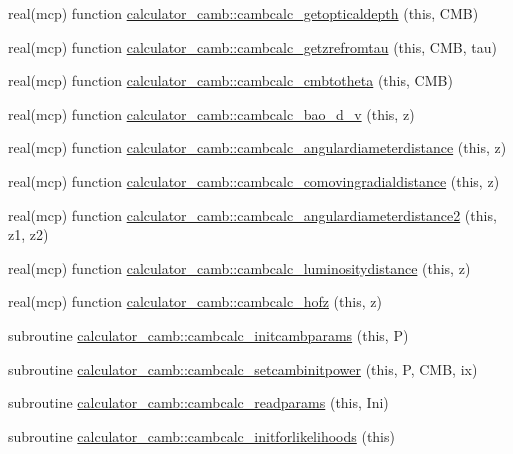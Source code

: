 \begin{DoxyCompactItemize}
\item 
real(mcp) function \mbox{\hyperlink{namespacecalculator__camb_ac09824dcbd350dcc819683a630b6e646}{calculator\+\_\+camb\+::cambcalc\+\_\+getopticaldepth}} (this, C\+MB)
\item 
real(mcp) function \mbox{\hyperlink{namespacecalculator__camb_a36d033f09a4d35c8b9a37d518fcebda0}{calculator\+\_\+camb\+::cambcalc\+\_\+getzrefromtau}} (this, C\+MB, tau)
\item 
real(mcp) function \mbox{\hyperlink{namespacecalculator__camb_a88bb5f71c4e4784315929d98702a1214}{calculator\+\_\+camb\+::cambcalc\+\_\+cmbtotheta}} (this, C\+MB)
\item 
real(mcp) function \mbox{\hyperlink{namespacecalculator__camb_a18709a68a49a6989073dae760f643430}{calculator\+\_\+camb\+::cambcalc\+\_\+bao\+\_\+d\+\_\+v}} (this, z)
\item 
real(mcp) function \mbox{\hyperlink{namespacecalculator__camb_a40bf5a8b3435b93efcaa688ecb4867f4}{calculator\+\_\+camb\+::cambcalc\+\_\+angulardiameterdistance}} (this, z)
\item 
real(mcp) function \mbox{\hyperlink{namespacecalculator__camb_a44d780a147bc9cea89b7ebe9a071b98a}{calculator\+\_\+camb\+::cambcalc\+\_\+comovingradialdistance}} (this, z)
\item 
real(mcp) function \mbox{\hyperlink{namespacecalculator__camb_a368f4f92f978124067f561deb5392714}{calculator\+\_\+camb\+::cambcalc\+\_\+angulardiameterdistance2}} (this, z1, z2)
\item 
real(mcp) function \mbox{\hyperlink{namespacecalculator__camb_a0f03309bd014f3de538a3565bc867402}{calculator\+\_\+camb\+::cambcalc\+\_\+luminositydistance}} (this, z)
\item 
real(mcp) function \mbox{\hyperlink{namespacecalculator__camb_a10e6be2c2d0ef7cb7741dbce3dbc88a9}{calculator\+\_\+camb\+::cambcalc\+\_\+hofz}} (this, z)
\item 
subroutine \mbox{\hyperlink{namespacecalculator__camb_a1f498feeb9fd7b4b6ff5c951bb3bcf5d}{calculator\+\_\+camb\+::cambcalc\+\_\+initcambparams}} (this, P)
\item 
subroutine \mbox{\hyperlink{namespacecalculator__camb_a30b5dc9bda2ffcd939436fbc93322f9e}{calculator\+\_\+camb\+::cambcalc\+\_\+setcambinitpower}} (this, P, C\+MB, ix)
\item 
subroutine \mbox{\hyperlink{namespacecalculator__camb_aa3a88e278563ca8092494c335094e325}{calculator\+\_\+camb\+::cambcalc\+\_\+readparams}} (this, Ini)
\item 
subroutine \mbox{\hyperlink{namespacecalculator__camb_a5eb19890ea9bf2acad52f23b9334e1e8}{calculator\+\_\+camb\+::cambcalc\+\_\+initforlikelihoods}} (this)

\end{DoxyCompactItemize}
